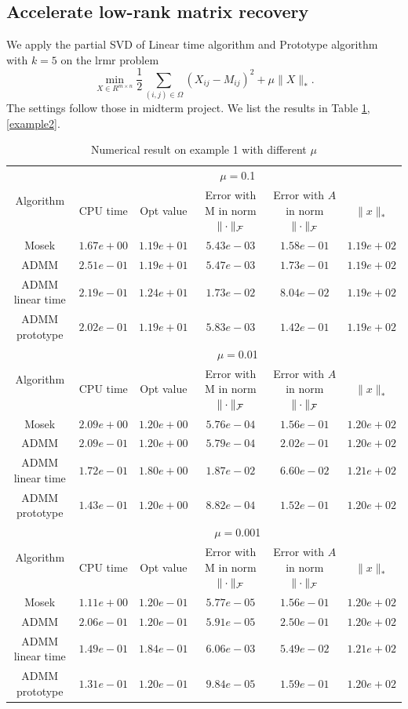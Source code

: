 \documentclass{article}
\begin{document}
\subsection{Accelerate low-rank matrix recovery}
We apply the partial SVD of Linear time algorithm and Prototype algorithm with $k=5$ on the lrmr problem
\begin{equation}
	\min _{X \in R^{m \times n}} \frac{1}{2} \sum_{(i, j) \in \Omega}\left(X_{i j}-M_{i j}\right)^{2}+\mu\|X\|_{*} .
	\end{equation}
	The settings follow those in midterm project. We list the results in Table \ref{example1},\ref{example2}.
	\begin{table}
		\centering
		\begin{tabular}{|c|c|c|c|c|c|}
		
		\hline
		\multirow{2}{*}{ Algorithm} &\multicolumn{5}{c|}{$\mu=$0.1}\\\cline{2-6}
		 &CPU time &Opt value &Error with M in norm $\|\cdot\|_\mathcal F$ &Error with $A$ in norm $\|\cdot\|_\mathcal F$ &$\|x\|_*$\\\hline
		Mosek & $1.67e+00$ & $1.19e+01$ & $5.43e-03$ & $1.58e-01$ & $1.19e+02$\\\hline
		ADMM & $2.51e-01$ & $1.19e+01$ & $5.47e-03$ & $1.73e-01$ & $1.19e+02$\\\hline
		ADMM linear time & $2.19e-01$ & $1.24e+01$ & $1.73e-02$ & $8.04e-02$ & $1.19e+02$\\\hline
		ADMM prototype & $2.02e-01$ & $1.19e+01$ & $5.83e-03$ & $1.42e-01$ & $1.19e+02$\\\hline
		\multirow{2}{*}{ Algorithm} &\multicolumn{5}{c|}{$\mu=$0.01}\\\cline{2-6}
 &CPU time &Opt value &Error with M in norm $\|\cdot\|_\mathcal F$ &Error with $A$ in norm $\|\cdot\|_\mathcal F$ &$\|x\|_*$\\\hline
Mosek & $2.09e+00$ & $1.20e+00$ & $5.76e-04$ & $1.56e-01$ & $1.20e+02$\\\hline
ADMM & $2.09e-01$ & $1.20e+00$ & $5.79e-04$ & $2.02e-01$ & $1.20e+02$\\\hline
ADMM linear time & $1.72e-01$ & $1.80e+00$ & $1.87e-02$ & $6.60e-02$ & $1.21e+02$\\\hline
ADMM prototype & $1.43e-01$ & $1.20e+00$ & $8.82e-04$ & $1.52e-01$ & $1.20e+02$\\\hline
\multirow{2}{*}{ Algorithm} &\multicolumn{5}{c|}{$\mu=$0.001}\\\cline{2-6}
 &CPU time &Opt value &Error with M in norm $\|\cdot\|_\mathcal F$ &Error with $A$ in norm $\|\cdot\|_\mathcal F$ &$\|x\|_*$\\\hline
Mosek & $1.11e+00$ & $1.20e-01$ & $5.77e-05$ & $1.56e-01$ & $1.20e+02$\\\hline
ADMM & $2.06e-01$ & $1.20e-01$ & $5.91e-05$ & $2.50e-01$ & $1.20e+02$\\\hline
ADMM linear time & $1.49e-01$ & $1.84e-01$ & $6.06e-03$ & $5.49e-02$ & $1.21e+02$\\\hline
ADMM prototype & $1.31e-01$ & $1.20e-01$ & $9.84e-05$ & $1.59e-01$ & $1.20e+02$\\\hline
		\end{tabular}
		\caption{Numerical result on example 1 with different $\mu$\label{example1}}
		
		\end{table}
\end{document}
